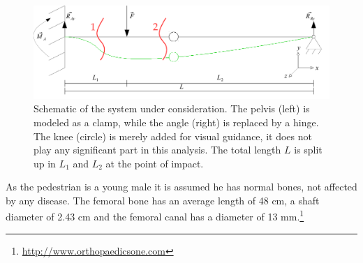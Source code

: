  \begin{figure}[htp]
\begin{center}
  \includegraphics[page=1,width=\textwidth]{img/hyper.pdf}
  \caption{Schematic of the system under consideration. The pelvis (left) is
  modeled as a clamp, while the angle (right) is replaced by a hinge. The knee
  (circle) is merely added for visual guidance, it does not play any
  significant part in this analysis. The total length $L$ is split up in $L_1$
  and $L_2$ at the point of impact.}
  \label{fig:hyper1}
\end{center}
\end{figure}

As the pedestrian is a young male it is assumed he has normal bones, not
affected by any disease. The femoral bone has an average length of 48 cm, a
shaft diameter of 2.43 cm and the femoral canal has a diameter of 13
mm.\footnote{\url{http://www.orthopaedicsone.com}}
